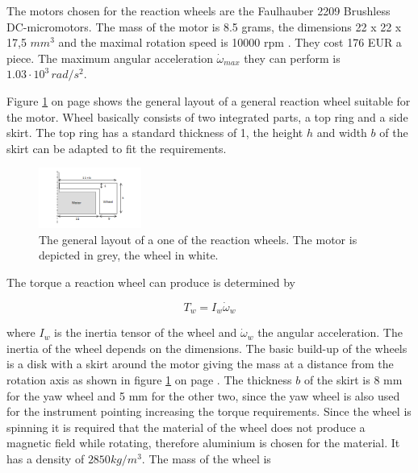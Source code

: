 The motors chosen for the reaction wheels are the Faulhauber 2209 Brushless DC-micromotors. The mass of the motor is 8.5 grams, the dimensions 22 x 22 x 17,5 $mm^3$ and the maximal rotation speed is 10000 rpm \cite{faulhaber}. They cost 176 EUR a piece. The maximum angular acceleration $\dot{\omega}_{max}$ they can perform is $1.03\cdot 10^3\,rad/s^2$. 

Figure \ref{fig:wheel} on page \pageref{fig:wheel} shows the general layout of a general reaction wheel suitable for the motor. Wheel basically consists of two integrated parts, a top ring and a side skirt. The top ring has a standard thickness of 1, the height $h$ and width $b$ of the skirt can be adapted to fit the requirements. 

\begin{figure}
\centering
\includegraphics[width=0.3\textwidth, bb=0 0 216px 190px]{chapters/img/reactionwheel.png}
\caption[Basic reaction wheel]{The general layout of a one of the reaction wheels. The motor is depicted in grey, the wheel in white.}
\label{fig:wheel}
\end{figure}

The torque a reaction wheel can produce is determined by

\begin{equation}
T_w = I_w \dot{\omega}_w
\label{wheeltorque}
\end{equation}

where $I_w$ is the inertia tensor of the wheel and $\dot{\omega}_w$ the angular acceleration. The inertia of the wheel depends on the dimensions.  The basic build-up of the wheels is a disk with a skirt around the motor giving the mass at a distance from the rotation axis as shown in figure \ref{fig:wheel} on page \pageref{fig:wheel}. The thickness $b$ of the skirt is 8 mm for the yaw wheel and 5 mm for the other two, since the yaw wheel is also used for the instrument pointing increasing the torque requirements. Since the wheel is spinning it is required that the material of the wheel does not produce a magnetic field while rotating, therefore aluminium is chosen for the material. It has a density of $2850 kg/m^3$. The mass of the wheel is 

